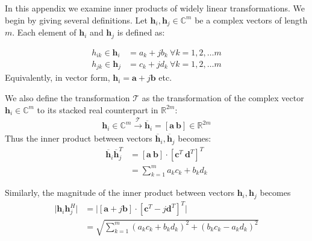 In this appendix we examine inner products of widely linear transformations. We begin by giving several definitions. Let $\textbf{h}_i,\textbf{h}_j \in \mathbb{C}^m$ be a complex vectors of length $m$. Each element of $\textbf{h}_i$ and $\textbf{h}_j$ is defined as:

\begin{equation}\label{eq:elm_chan_vec}
    \begin{aligned}
    h_{ik}\in\textbf{h}_i &= a_k+jb_k\ \forall k =1,2,\ldots m \\
    h_{jk}\in\textbf{h}_j &= c_k+jd_k\ \forall k =1,2,\ldots m
    \end{aligned}
\end{equation}
Equivalently, in vector form, $\textbf{h}_i = \textbf{a}+j\textbf{b}$ etc.

We also define the transformation $\mathcal{T}$ as the transformation of the complex vector $\textbf{h}_i\in\mathbb{C}^m$ to its stacked real counterpart in $\mathbb{R}^{2m}$:
\begin{equation}\label{eq:app_complex_real_xform}
    \begin{aligned}
        \textbf{h}_i \in \mathbb{C}^m \xrightarrow{\mathcal{T}} \overline{\textbf{h}}_i = [ \textbf{a} \ \textbf{b} ] \in \mathbb{R}^{2m}
    \end{aligned}
\end{equation}
Thus the inner product between vectors $\overline{\textbf{h}}_i,\overline{\textbf{h}}_j$ becomes:
\begin{equation}\label{eq:app_inner_product_wl_sum}
    \begin{aligned}
       \overline{\textbf{h}}_i\overline{\textbf{h}}_j^T &= [\textbf{a}\ \textbf{b}]\cdot[\textbf{c}^T\ \textbf{d}^T]^T\\
       &= \sum_{k=1}^m a_kc_k+b_kd_k
    \end{aligned}
\end{equation}

Similarly, the magnitude of the inner product between vectors $\textbf{h}_i,\textbf{h}_j$ becomes
\begin{equation}\label{eq:app_inner_product_sum}
    \begin{aligned}
       \vert\textbf{h}_i\textbf{h}_j^H\vert &= \vert[\textbf{a}+j\textbf{b}]\cdot[\textbf{c}^T-j\textbf{d}^T]^T\vert\\
       &= \sqrt{\sum_{k=1}^m (a_kc_k+b_kd_k)^2+(b_kc_k-a_kd_k)^2}
    \end{aligned}
\end{equation}

